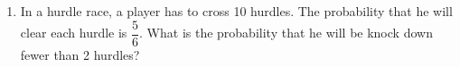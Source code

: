 \begin{enumerate}[label=\thechapter.\arabic*,ref=\thechapter.\theenumi]
\item In a hurdle race, a player has to cross 10 hurdles. The probability that he will clear each hurdle is $\dfrac{5}{6}$. What is the probability that he will be knock down fewer than 2 hurdles? 
\end{enumerate}
